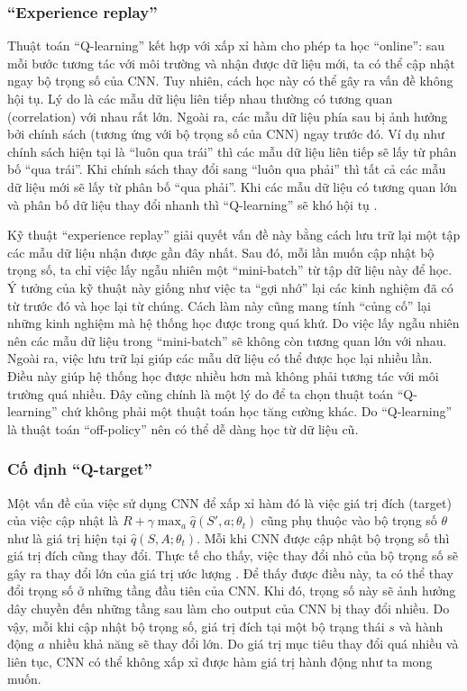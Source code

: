 \subsubsection*{``Experience replay''}
	Thuật toán ``Q-learning'' kết hợp với xấp xỉ hàm cho phép ta học ``online'': sau mỗi bước tương tác với môi trường và nhận được dữ liệu mới, ta có thể cập nhật ngay bộ trọng số của CNN.
	Tuy nhiên, cách học này có thể gây ra vấn đề không hội tụ.
	Lý do là các mẫu dữ liệu liên tiếp nhau thường có tương quan (correlation) với nhau rất lớn.
	Ngoài ra, các mẫu dữ liệu phía sau bị ảnh hưởng bởi chính sách (tương ứng với bộ trọng số của CNN) ngay trước đó.
	Ví dụ như chính sách hiện tại là ``luôn qua trái'' thì các mẫu dữ liệu liên tiếp sẽ lấy từ phân bố ``qua trái''.
	Khi chính sách thay đổi sang ``luôn qua phải'' thì tất cả các mẫu dữ liệu mới sẽ lấy từ phân bố ``qua phải''.
	Khi các mẫu dữ liệu có tương quan lớn và phân bố dữ liệu thay đổi nhanh thì ``Q-learning'' sẽ khó hội tụ \cite{mnihdqn2015}.
	
	Kỹ thuật ``experience replay'' giải quyết vấn đề này bằng cách lưu trữ lại một tập các mẫu dữ liệu nhận được gần đây nhất.
	Sau đó, mỗi lần muốn cập nhật bộ trọng số, ta chỉ việc lấy ngẫu nhiên một ``mini-batch'' từ tập dữ liệu này để học.
	Ý tưởng của kỹ thuật này giống như việc ta ``gợi nhớ'' lại các kinh nghiệm đã có từ trước đó và học lại từ chúng.
	Cách làm này cũng mang tính ``củng cố'' lại những kinh nghiệm mà hệ thống học được trong quá khứ.
	Do việc lấy ngẫu nhiên nên các mẫu dữ liệu trong ``mini-batch'' sẽ không còn tương quan lớn với nhau.
	Ngoài ra, việc lưu trữ lại giúp các mẫu dữ liệu có thể được học lại nhiều lần.
	Điều này giúp hệ thống học được nhiều hơn mà không phải tương tác với môi trường quá nhiều.
	Đây cũng chính là một lý do để ta chọn thuật toán ``Q-learning'' chứ không phải một thuật toán học tăng cường khác.
	Do ``Q-learning'' là thuật toán ``off-policy'' nên có thể dễ dàng học từ dữ liệu cũ.
	
\subsubsection*{Cố định ``Q-target''}
	Một vấn đề của việc sử dụng CNN để xấp xỉ hàm đó là việc giá trị đích (target) của việc cập nhật là $R + \gamma \max_{a}\hat{q}(S', a;\theta_t)$ cũng phụ thuộc vào bộ trọng số $\theta$ như là giá trị hiện tại $\hat{q}(S, A;\theta_t)$.
	Mỗi khi CNN được cập nhật bộ trọng số thì giá trị đích cũng thay đổi.
	Thực tế cho thấy, việc thay đổi nhỏ của bộ trọng số sẽ gây ra thay đổi lớn của giá trị ước lượng \cite{mnih2013playing}.
	Để thấy được điều này, ta có thể thay đổi trọng số ở những tầng đầu tiên của CNN.
	Khi đó, trọng số này sẽ ảnh hưởng dây chuyền đến những tầng sau làm cho output của CNN bị thay đổi nhiều.
	Do vậy, mỗi khi cập nhật bộ trọng số, giá trị đích tại một bộ trạng thái $s$ và hành động $a$ nhiều khả năng sẽ thay đổi lớn.
	Do giá trị mục tiêu thay đổi quá nhiều và liên tục, CNN có thể không xấp xỉ được hàm giá trị hành động như ta mong muốn.
	
